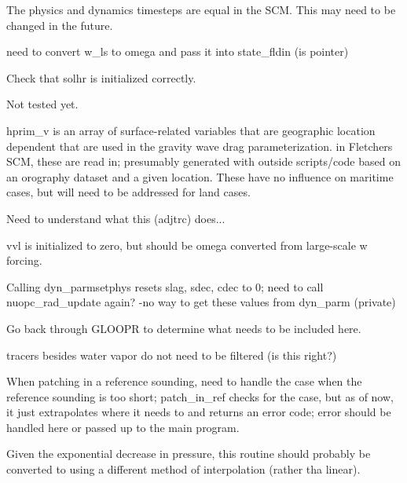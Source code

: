 \begin{DoxyRefList}
The physics and dynamics timesteps are equal in the S\+CM. This may need to be changed in the future. 

need to convert w\+\_\+ls to omega and pass it into state\+\_\+fldin (is pointer) 

Check that solhr is initialized correctly. 

Not tested yet. 

hprim\+\_\+v is an array of surface-\/related variables that are geographic location dependent that are used in the gravity wave drag parameterization. in Fletcher\textquotesingle{}s S\+CM, these are read in; presumably generated with outside scripts/code based on an orography dataset and a given location. These have no influence on maritime cases, but will need to be addressed for land cases. 

Need to understand what this (adjtrc) does... 

vvl is initialized to zero, but should be omega converted from large-\/scale w forcing. 

Calling dyn\+\_\+parmsetphys resets slag, sdec, cdec to 0; need to call nuopc\+\_\+rad\+\_\+update again? -\/no way to get these values from dyn\+\_\+parm (private) 

Go back through G\+L\+O\+O\+PR to determine what needs to be included here. 

tracers besides water vapor do not need to be filtered (is this right?)  
\item[\label{todo__todo000014}%
\hypertarget{todo__todo000014}{}%
Subprogram \hyperlink{group__setup_ga7a3fc65081b77cb24cc8fd62f8b57432}{gmtb\+\_\+scm\+\_\+setup\+:\+:set\+\_\+state} (n\+\_\+input\+\_\+levels, input\+\_\+pres, input\+\_\+qt, input\+\_\+thetail, input\+\_\+ql, input\+\_\+qi, input\+\_\+u, input\+\_\+v, input\+\_\+ozone, n\+\_\+model\+\_\+levels, n\+\_\+columns, ntoz, ntcw, pres\+\_\+l, n\+\_\+smooth\+\_\+levels, n\+\_\+ref\+\_\+levels, ref\+\_\+pres, ref\+\_\+qv, ref\+\_\+T, ref\+\_\+ozone, state\+\_\+tracer, state\+\_\+T, state\+\_\+u, state\+\_\+v)]When patching in a reference sounding, need to handle the case when the reference sounding is too short; patch\+\_\+in\+\_\+ref checks for the case, but as of now, it just extrapolates where it needs to and returns an error code; error should be handled here or passed up to the main program.  
\item[\label{todo__todo000015}%
\hypertarget{todo__todo000015}{}%
Subprogram \hyperlink{group__utils_gadaa5d6afea19af5a67f29f4cde5a94af}{gmtb\+\_\+scm\+\_\+utils\+:\+:interpolate\+\_\+to\+\_\+grid\+\_\+centers} (n\+\_\+input\+\_\+levels, input\+\_\+pres, input\+\_\+field, pres\+\_\+l, n\+\_\+model\+\_\+levels, model\+\_\+field, last\+\_\+initialized)]Given the exponential decrease in pressure, this routine should probably be converted to using a different method of interpolation (rather tha linear). 
\end{DoxyRefList}